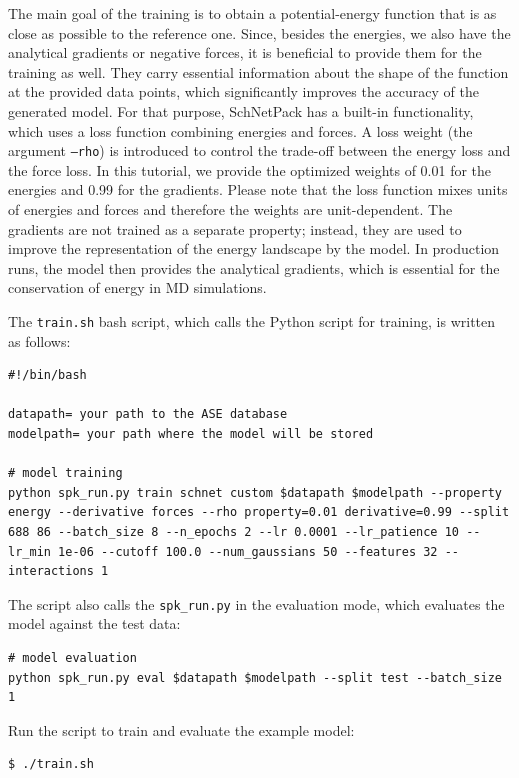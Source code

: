 The main goal of the training is to obtain a potential-energy function that is as close as possible to the reference one. Since, besides the energies, we also have the analytical gradients or negative forces, it is beneficial to provide them for the training as well. They carry essential information about the shape of the function at the provided data points, which significantly improves the accuracy of the generated model. For that purpose, SchNetPack has a built-in functionality, which uses a loss function combining energies and forces. A loss weight (the argument \texttt{--rho}) is introduced to control the trade-off between the energy loss and the force loss. In this tutorial, we provide the optimized weights of 0.01 for the energies and 0.99 for the gradients. Please note that the loss function mixes units of energies and forces and therefore the weights are unit-dependent. The gradients are not trained as a separate property; instead, they are used to improve the representation of the energy landscape by the model. In production runs, the model then provides the analytical gradients, which is essential for the conservation of energy in MD simulations.

The \texttt{train.sh} bash script, which calls the Python script for training, is written as follows:
\begin{lstlisting}[breaklines=true, breakatwhitespace=false]
#!/bin/bash

datapath= your path to the ASE database
modelpath= your path where the model will be stored

# model training
python spk_run.py train schnet custom $datapath $modelpath --property energy --derivative forces --rho property=0.01 derivative=0.99 --split 688 86 --batch_size 8 --n_epochs 2 --lr 0.0001 --lr_patience 10 --lr_min 1e-06 --cutoff 100.0 --num_gaussians 50 --features 32 --interactions 1
\end{lstlisting}


The script also calls the \texttt{spk\_run.py} in the evaluation mode, which evaluates the model against the test data:

\begin{lstlisting}[breaklines=true, breakatwhitespace=false]
# model evaluation
python spk_run.py eval $datapath $modelpath --split test --batch_size 1
\end{lstlisting}


Run the script to train and evaluate the example model:

\begin{lstlisting}[breaklines=true, breakatwhitespace=false]
$ ./train.sh
\end{lstlisting}


